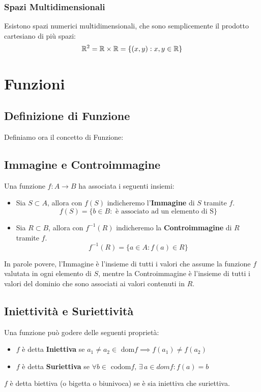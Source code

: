     \subsubsection*{Spazi Multidimensionali}
    Esistono spazi numerici multidimensionali, che sono semplicemente il prodotto cartesiano di più spazi:
    \[ \mathbb{R}^2 = \mathbb{R} \times \mathbb{R} = \{ (x,y):x,y\in \mathbb{R}\}\]
    \section*{Funzioni} 
    \subsection*{Definizione di Funzione}
    Definiamo ora il concetto di Funzione:
    \subsection*{Immagine e Controimmagine}
    Una funzione $f:A\to B$ ha associata i seguenti insiemi:
    \begin{itemize}
        \item Sia $S \subset A$, allora con $f(S)$ indicheremo l'\textbf{Immagine} di $S$ tramite $f$.
            \[ f(S)=\{b \in B: \text{ è associato ad un elemento di S}\} \]
        \item Sia $R \subset B$, allora con $f^{-1}(R)$ indicheremo la \textbf{Controimmagine} di $R$ tramite $f$.
        \[ f^{-1}(R)=\{a \in A: f(a) \in R \} \]
    \end{itemize}
    In parole povere, l'Immagine è l'insieme di tutti i valori che assume la funzione $f$ valutata in ogni elemento di $S$, mentre
    la Controimmagine è l'insieme di tutti i valori del dominio che sono associati ai valori contenuti in $R$.
    \subsection*{Iniettività e Suriettività}
    Una funzione può godere delle seguenti proprietà:
    \begin{itemize}
        \item $f$ è detta \textbf{Iniettiva} se $ a_1 \neq a_2 \in \text{ dom}f \implies f(a_1) \neq f(a_2)$
        \item $f$ è detta \textbf{Suriettiva} se $\forall b \in \text{ codom}f, \, \exists \, a \in dom f:f(a)=b$
    \end{itemize}
    $f$ è detta biettiva (o bigetta o biunivoca) se è sia iniettiva che suriettiva.

